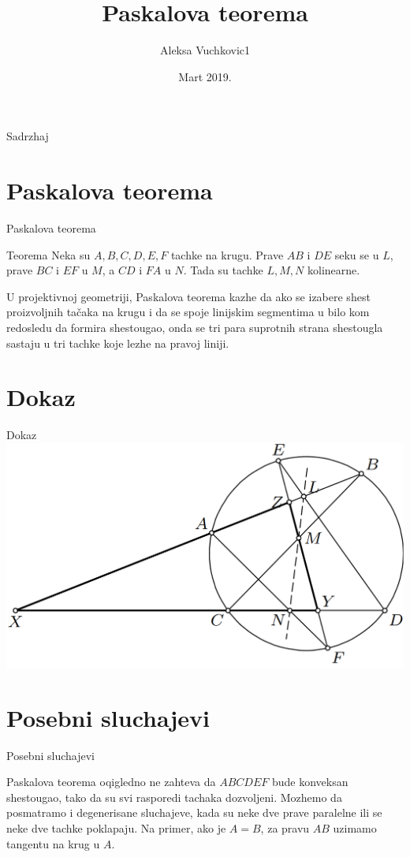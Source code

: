 \documentclass{beamer}
\title{Paskalova teorema}
\author{Aleksa Vuchkovic1}
\institute{Matematichka gimnazija}
\date{Mart 2019.}
\begin{document}
\maketitle

\begin{frame}{Sadrzhaj}
\tableofcontents
\end{frame}

\section{Paskalova teorema}
\begin{frame}{Paskalova teorema}
\begin{block}{Teorema}
Neka su $A,B,C,D,E,F$ tachke na krugu. Prave $AB$ i $DE$ seku se u $L$, prave $BC$ i $EF$ u $M$, a $CD$ i $FA$ u $N$. Tada su tachke $L,M,N$ kolinearne.
\end{block}
\vspace{4mm}
\begin{block}{}
U projektivnoj geometriji, Paskalova teorema kazhe da ako se izabere shest proizvoljnih tačaka na krugu i da se spoje linijskim segmentima u bilo kom redosledu da formira shestougao, onda se tri para suprotnih strana shestougla sastaju u tri tachke koje lezhe na pravoj liniji.
\end{block}
\end{frame}

\section{Dokaz}
\begin{frame}{Dokaz}
\centering \includegraphics[scale=0.3]{Paskal}
\end{frame}

\section{Posebni sluchajevi}
\begin{frame}{Posebni sluchajevi}
\begin{block}{}
Paskalova teorema oqigledno ne zahteva da $ABCDEF$ bude konveksan shestougao, tako da su svi rasporedi tachaka dozvoljeni. Mozhemo da posmatramo i degenerisane sluchajeve, kada su neke dve prave paralelne ili se neke dve tachke poklapaju. Na primer, ako je $A = B$, za pravu $AB$ uzimamo tangentu na krug u $A$.
\end{block}
\end{frame}
\end{document}

